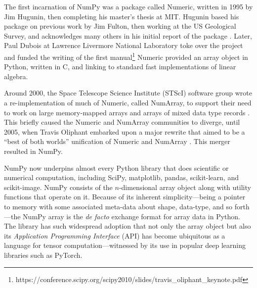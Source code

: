 The first incarnation of NumPy was a package called Numeric, written in 1995
by Jim Hugunin, then completing his master's thesis at MIT.
Hugunin based his package on previous work by Jim Fulton,
then working at the US Geological Survey, and acknowledges
many others in his initial report of the package \cite{Hugunin-whitepaper}.
Later, Paul Dubois at Lawrence Livermore National Laboratory toke over the project
and funded the writing of the first
manual\footnote{https://conference.scipy.org/scipy2010/slides/travis\_oliphant\_keynote.pdf}
Numeric provided an array object in Python, written in C, and linking to
standard fast implementations of linear algebra.

Around 2000, the Space Telescope Science Institute (STScI) software group wrote
a re-implementation of much of Numeric, called NumArray, to support their
need to work on large memory-mapped arrays and arrays of mixed data type
records \cite{STScI-slither}.
This briefly caused the Numeric and NumArray communities to diverge, until 2005,
when Travis Oliphant embarked upon a major rewrite that aimed to be a ``best of
both worlds'' unification of Numeric and NumArray \cite{oliphant2006guide}.
This merger resulted in NumPy.

NumPy now underpins almost every Python library that does scientific or
numerical computation, including SciPy\cite{virtanen2019scipy},
matplotlib\cite{hunter2007matplotlib}, pandas\cite{mckinney-proc-scipy-2010},
scikit-learn\cite{pedregosa2011scikit}, and
scikit-image\cite{vanderwalt2014scikit}.
NumPy consists of the $n$-dimensional array object along with utility functions
that operate on it.
Because of its inherent simplicity---being a pointer to memory with some
associated meta-data about shape, data-type, and so forth---the NumPy array is
the {\it de facto} exchange format for array data in Python.
The library has such widespread adoption that not only the array object but also its
{\it Application Programming Interface} (API) has become ubiquitous as
a language for tensor computation---witnessed by its use in popular
deep learning libraries such as PyTorch\cite{pytorch}.

